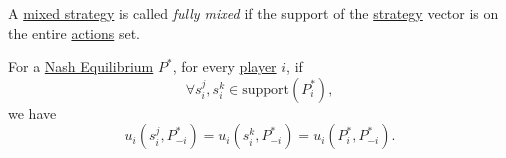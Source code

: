 \begin{definition}\label{def:fully-mixed}
	A \hyperref[def:mixed-strategy]{mixed strategy} is called \emph{fully mixed} if the support of the \hyperref[def:strategy]{strategy} vector is on the entire \hyperref[def:strategy]{actions} set.
\end{definition}

\begin{theorem}\label{thm:principle-of-indifference}
	For a \hyperref[def:Nash-equilibrium]{Nash Equilibrium} \(P^{\ast}\), for every \hyperref[def:player]{player} \(i\), if
	\[
		\forall s_{i}^j, s_{i}^k\in \text{support}(P_{i}^{\ast}),
	\]
	we have
	\[
		u_{i}(s_{i}^j, P_{-i}^{\ast}) = u_{i}(s_{i}^k, P_{-i}^{\ast}) = u_{i}(P_{i}^*, P_{-i}^{\ast}).
	\]
\end{theorem}
